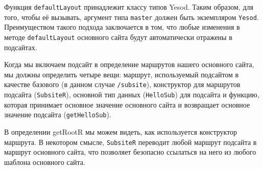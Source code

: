 Функция \lstinline!defaultLayout! принадлежит классу типов Yesod. Таким образом, для того, чтобы её вызывать, аргумент типа \lstinline!master! должен быть экземпляром \lstinline!Yesod!.  Преимуществом такого подхода заключается в том, что любые изменения в методе \lstinline!defaultLayout! основного сайта будут автоматически отражены в подсайтах.

Когда мы включаем подсайт в определение маршрутов нашего основного сайта, мы должны определить четыре вещи: маршрут, используемый подсайтом в качестве базового (в данном случае \lstinline!/subsite!), конструктор для маршрутов подсайта (\lstinline!SubsiteR!), основной тип данных (\lstinline!HelloSub!) для подсайта и функцию, которая принимает основное значение основного сайта и возвращает основное значение подсайта (\lstinline!getHelloSub!).

В определении getRootR мы можем видеть, как используется конструктор маршрута. В некотором смысле, \lstinline!SubsiteR! переводит любой маршрут подсайта в маршрут основного сайта, что позволяет безопасно ссылаться на него из любого шаблона основного сайта.
